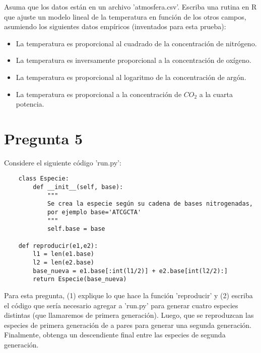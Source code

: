\documentclass{article}
\begin{document}
Asuma que los datos están en un archivo 'atmosfera.csv'. Escriba una rutina en R que ajuste un modelo lineal de la temperatura en función de los otros campos, asumiendo los siguientes datos empíricos (inventados para esta prueba): 
    \begin{itemize}
        \item La temperatura es proporcional al cuadrado de la concentración de nitrógeno.
        \item La temperatura es inversamente proporcional a la concentración de oxígeno.
        \item La temperatura es proporcional al logaritmo de la concentración de argón.
        \item La temperatura es proporcional a la concentración de $CO_2$ a la cuarta potencia.
    \end{itemize}
\section*{Pregunta 5}
Considere el siguiente código 'run.py':
    \begin{verbatim}
    class Especie:
        def __init__(self, base):
            """
            Se crea la especie según su cadena de bases nitrogenadas,
            por ejemplo base='ATCGCTA'
            """
            self.base = base

    def reproducir(e1,e2):
        l1 = len(e1.base)
        l2 = len(e2.base)
        base_nueva = e1.base[:int(l1/2)] + e2.base[int(l2/2):]
        return Especie(base_nueva)
    \end{verbatim}
Para esta pregunta, (1) explique lo que hace la función 'reproducir' y (2) escriba el código que sería necesario agregar a 'run.py' para generar cuatro especies distintas (que llamaremos de primera generación). Luego, que se reproduzcan las especies de primera generación de a pares para generar una segunda generación. Finalmente, obtenga un descendiente final entre las especies de segunda generación.
\end{document}
